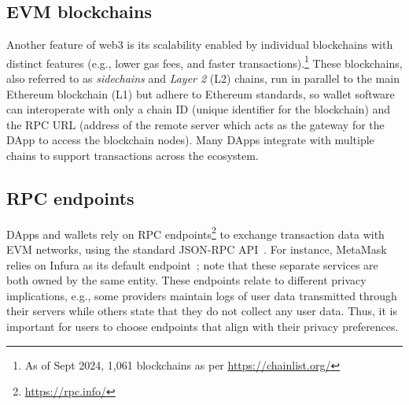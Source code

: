 \documentclass[conference]{IEEEtran}
\begin{document}
\subsection{\ac*{EVM} blockchains}
Another feature of web3 is its scalability enabled by individual blockchains with distinct features (e.g., lower gas fees, and faster transactions).\footnote{As of Sept 2024, 1,061 blockchains as per \url{https://chainlist.org/}} %
These blockchains, also referred to as \textit{sidechains} and \textit{Layer 2} (L2) chains, run in parallel to the main Ethereum blockchain (L1) but adhere to Ethereum standards, so wallet software can interoperate with only a chain ID (unique identifier for the blockchain) and the \ac*{RPC} URL (address of the remote server which acts as the gateway for the DApp to access the blockchain nodes).
Many DApps integrate with multiple chains to support transactions across the ecosystem.



\subsection{RPC endpoints}
\label{sec:background:rpc}
DApps and wallets rely on RPC endpoints\footnote{\url{https://rpc.info/}} to exchange transaction data with \ac*{EVM} networks, using the standard JSON-RPC API~\cite{metamaskJsonRpcApi}.
For instance, MetaMask relies on Infura as its default endpoint~\cite{metamaskInfura}; note that these separate services are both owned by the same entity.
These endpoints relate to different privacy implications, e.g., some providers maintain logs of user data transmitted through their servers while others state that they do not collect any user data.
Thus, it is important for users to choose endpoints that align with their privacy preferences.
\end{document}
